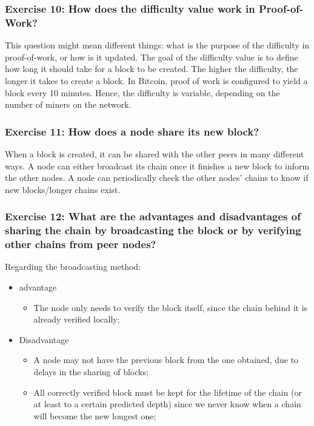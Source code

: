 \documentclass[12pt,a4paper]{article}
\begin{document}
\subsubsection*{Exercise 10: How does the difficulty value work in Proof-of-Work?}
This question might mean different things: what is the purpose of the difficulty in proof-of-work, or how is it updated. The goal of the difficulty value is to define how long it should take for a block to be created.  The higher the difficulty, the longer it takes to create a block. In Bitcoin, proof of work is configured to yield a block every 10 minutes. Hence, the difficulty is variable, depending on the number of miners on the network.



\subsubsection*{Exercise 11: How does a node share its new block?}
When a block is created, it can be shared with the other peers in many different ways. A node can either broadcast its chain once it finishes a new block to inform the other nodes. A node can periodically check the other nodes' chains to know if new blocks/longer chains exist.

\subsubsection*{Exercise 12: What are the advantages and disadvantages of sharing the chain by broadcasting the block or by verifying other chains from peer nodes?}
Regarding the broadcasting method:
\begin{itemize}
\item advantage
\begin{itemize}
\item The node only needs to verify the block itself, since the chain behind it is already verified locally;
\end{itemize}
\item Disadvantage
\begin{itemize}
\item A node may not have the previous block from the one obtained, due to delays in the sharing of blocks;
\item All correctly verified block must be kept for the lifetime of the chain (or at least to a certain predicted depth) since we never know when a chain will become the new longest one;
\end{itemize}
\end{itemize}
\end{document}
